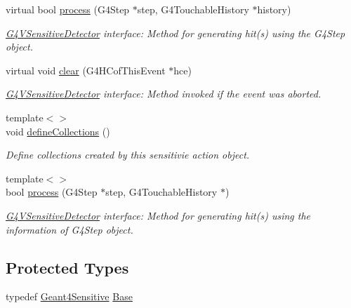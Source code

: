 \begin{DoxyCompactItemize}
virtual bool \hyperlink{class_tests_1_1_geant4_sensitive_action_a6ae919f9aeb71219a38300d3918ed814}{process} (G4Step $\ast$step, G4TouchableHistory $\ast$history)
\begin{DoxyCompactList}\small\item\em \hyperlink{class_g4_v_sensitive_detector}{G4VSensitiveDetector} interface: Method for generating hit(s) using the G4Step object. \item\end{DoxyCompactList}\item 
virtual void \hyperlink{class_tests_1_1_geant4_sensitive_action_a4d02434822c244ee5c5d6aee7e15c993}{clear} (G4HCofThisEvent $\ast$hce)
\begin{DoxyCompactList}\small\item\em \hyperlink{class_g4_v_sensitive_detector}{G4VSensitiveDetector} interface: Method invoked if the event was aborted. \item\end{DoxyCompactList}\item 
{\footnotesize template$<$$>$ }\\void \hyperlink{class_tests_1_1_geant4_sensitive_action_a1b06a4ee804c34ed5a77145c4b2ec736}{defineCollections} ()
\begin{DoxyCompactList}\small\item\em Define collections created by this sensitivie action object. \item\end{DoxyCompactList}\item 
{\footnotesize template$<$$>$ }\\bool \hyperlink{class_tests_1_1_geant4_sensitive_action_acd1c0fc85d8ade97401c76f14bf2b32b}{process} (G4Step $\ast$step, G4TouchableHistory $\ast$)
\begin{DoxyCompactList}\small\item\em \hyperlink{class_g4_v_sensitive_detector}{G4VSensitiveDetector} interface: Method for generating hit(s) using the information of G4Step object. \item\end{DoxyCompactList}\end{DoxyCompactItemize}
\subsection*{Protected Types}
\begin{DoxyCompactItemize}
\item 
typedef \hyperlink{class_d_d4hep_1_1_simulation_1_1_geant4_sensitive}{Geant4Sensitive} \hyperlink{class_tests_1_1_geant4_sensitive_action_afb2235077e4e86f00859155e5379bbad}{Base}
\end{DoxyCompactItemize}
